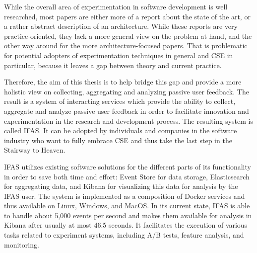 While the overall area of experimentation in software development is well researched, most papers are either more of a report about the state of the art, or a rather abstract description of an architecture.
While these reports are very practice-oriented, they lack a more general view on the problem at hand, and the other way around for the more architecture-focused papers.
That is problematic for potential adopters of experimentation techniques in general and \ac{CSE} in particular, because it leaves a gap between theory and current practice.

Therefore, the aim of this thesis is to help bridge this gap and provide a more holistic view on collecting, aggregating and analyzing passive user feedback.
%
The result is a system of interacting services which provide the ability to collect, aggregate and analyze passive user feedback in order to facilitate innovation and experimentation in the research and development process.
The resulting system is called \ac{IFAS}.
It can be adopted by individuals and companies in the software industry who want to fully embrace \ac{CSE} and thus take the last step in the Stairway to Heaven.

\ac{IFAS} utilizes existing software solutions for the different parts of its functionality in order to save both time and effort:
Event Store for data storage, Elasticsearch for aggregating data, and Kibana for visualizing this data for analysis by the \ac{IFAS} user.
The system is implemented as a composition of Docker services and thus available on Linux, Windows, and MacOS.
In its current state, \ac{IFAS} is able to handle about 5,000 events per second and makes them available for analysis in Kibana after usually at most 46.5 seconds.
It facilitates the execution of various tasks related to experiment systems, including A/B tests, feature analysis, and monitoring.

